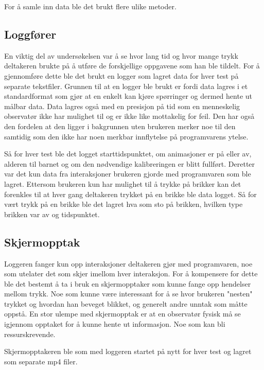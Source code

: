  
For å samle inn data ble det brukt flere ulike metoder.  
 
 
\subsection{Loggfører} 

En viktig del av undersøkelsen var å se hvor lang tid og hvor mange trykk deltakeren brukte på å utføre de forskjellige oppgavene som han ble tildelt. For å gjennomføre dette ble det brukt en logger som lagret data for hver test på separate tekstfiler. Grunnen til at en logger ble brukt er fordi data lagres i et standardformat som gjør at en enkelt kan kjøre spørringer og dermed hente ut målbar data. Data lagres også med en presisjon på tid som en menneskelig observatør ikke har mulighet til og er ikke like mottakelig for feil. Den har også den fordelen at den ligger i bakgrunnen uten brukeren merker noe til den samtidig som den ikke har noen merkbar innflytelse på programvarens ytelse. 
 
 
Så for hver test ble det logget starttidspunktet, om animasjoner er på eller av, alderen til barnet og om den nødvendige kalibreringen er blitt fullført. Deretter var det kun data fra interaksjoner brukeren gjorde med programvaren som ble lagret. Ettersom brukeren kun har mulighet til å trykke på brikker kan det forenkles til at hver gang deltakeren trykket på en brikke ble data logget. Så for vært trykk på en brikke ble det lagret hva som sto på brikken, hvilken type brikken var av og tidspunktet. 
 
 
 
\subsection{Skjermopptak} 
 
Loggeren fanger kun opp interaksjoner deltakeren gjør med programvaren, noe som utelater det som skjer imellom hver interaksjon. For å kompensere for dette ble det bestemt å ta i bruk en skjermopptaker som kunne fange opp hendelser mellom trykk. Noe som kunne være interessant for å se hvor brukeren "nesten" trykket og hvordan han beveget blikket, og generelt andre unntak som måtte oppstå. En stor ulempe med skjermopptak er at en observatør fysisk må se igjennom opptaket for å kunne hente ut informasjon. Noe som kan bli ressurskrevende.
 
Skjermopptakeren ble som med loggeren startet på nytt for hver test og lagret som separate mp4 filer.  
 
